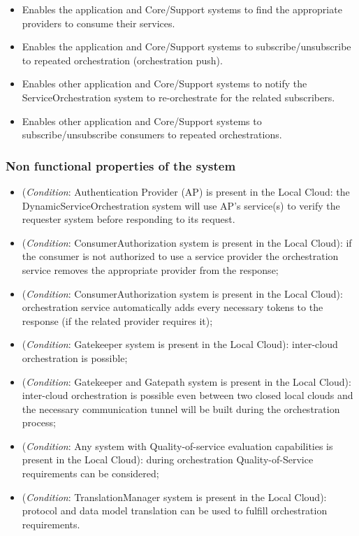 \documentclass[a4paper]{arrowhead}
\begin{document}
\begin{itemize}
    \item Enables the application and Core/Support systems to find the appropriate providers to consume their services.
    \item Enables the application and Core/Support systems to subscribe/unsubscribe to repeated orchestration (orchestration push).
    \item Enables other application and Core/Support systems to notify the ServiceOrchestration system to re-orchestrate for the related subscribers.
    \item Enables other application and Core/Support systems to subscribe/unsubscribe consumers to repeated orchestrations.
\end{itemize}

\subsubsection {Non functional properties of the system}

\begin{itemize}
    \item (\textit{Condition}: Authentication Provider (AP) is present in the Local Cloud: the DynamicServiceOrchestration system will use AP's service(s) to verify the requester system before responding to its request.
    \item (\textit{Condition}: ConsumerAuthorization system is present in the Local Cloud): if the consumer is not authorized to use a service provider the orchestration service removes the appropriate provider from the response;
    \item (\textit{Condition}: ConsumerAuthorization system is present in the Local Cloud): orchestration service automatically adds every necessary tokens to the response (if the related provider requires it);
    \item (\textit{Condition}: Gatekeeper system is present in the Local Cloud): inter-cloud orchestration is possible;
    \item (\textit{Condition}: Gatekeeper and Gatepath system is present in the Local Cloud): inter-cloud orchestration is possible even between two closed local clouds and the necessary communication tunnel will be built during the orchestration process;
    \item (\textit{Condition}: Any system with Quality-of-service evaluation capabilities is present in the Local Cloud): during orchestration Quality-of-Service requirements can be considered;
    \item (\textit{Condition}: TranslationManager system is present in the Local Cloud): protocol and data model translation can be used to fulfill orchestration requirements.
\end{itemize}
\end{document}

